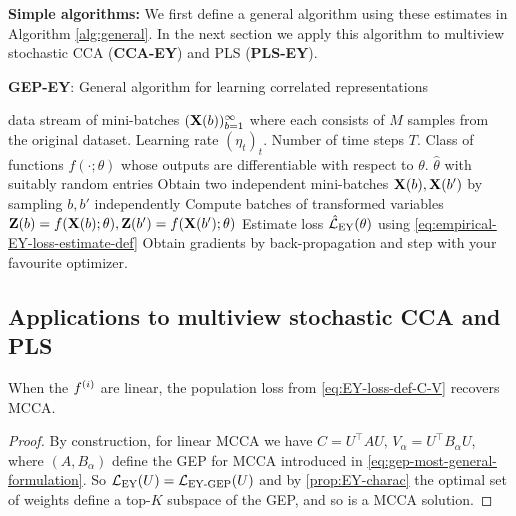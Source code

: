 \textbf{Simple algorithms:}
We first define a general algorithm using these estimates in Algorithm \ref{alg:general}. In the next section we apply this algorithm to multiview stochastic CCA (\textbf{CCA-EY}) and PLS (\textbf{PLS-EY}).

\begin{algorithm}
   \caption{\textbf{GEP-EY}: General algorithm for learning correlated representations}
   \label{alg:general}
\begin{algorithmic}
    data stream of mini-batches $(\mathbf{X}(b))_{b=1}^\infty$ where each consists of $M$ samples from the original dataset. Learning rate $(\eta_t)_t$. Number of time steps $T$. Class of functions $f(\cdot; \theta)$ whose outputs are differentiable with respect to $\theta$.
    $\hat{\theta}$ with suitably random entries
       \STATE Obtain two independent mini-batches \( \mathbf{X}(b), \mathbf{X}(b') \) by sampling \( b, b' \) independently
       \STATE Compute batches of transformed variables $\mathbf{Z}(b) = f(\mathbf{X}(b); \theta), \mathbf{Z}(b') = f(\mathbf{X}(b'); \theta)$
       \STATE Estimate loss $\hat{\mathcal{L}}_\text{EY}(\theta)$ using \cref{eq:empirical-EY-loss-estimate-def}
       \STATE Obtain gradients by back-propagation and step with your favourite optimizer.
   \ENDFOR
\end{algorithmic}
\end{algorithm}

\subsection{Applications to multiview stochastic CCA and PLS}
\begin{lemma}
    When the $f^{(i)}$ are linear, the population loss from \cref{eq:EY-loss-def-C-V} recovers MCCA.
\end{lemma}
\begin{proof}
    By construction, for linear MCCA we have $C = U^\top A U,\, V_\alpha=U^\top B_\alpha U$, where $(A, B_\alpha)$ define the GEP for MCCA introduced in \cref{eq:gep-most-general-formulation}. 
    So $\mathcal{L}_\text{EY}(U) = \mathcal{L}_\text{EY-GEP}(U)$ and by \cref{prop:EY-charac} the optimal set of weights define a top-$K$ subspace of the GEP, and so is a MCCA solution.
\end{proof}

